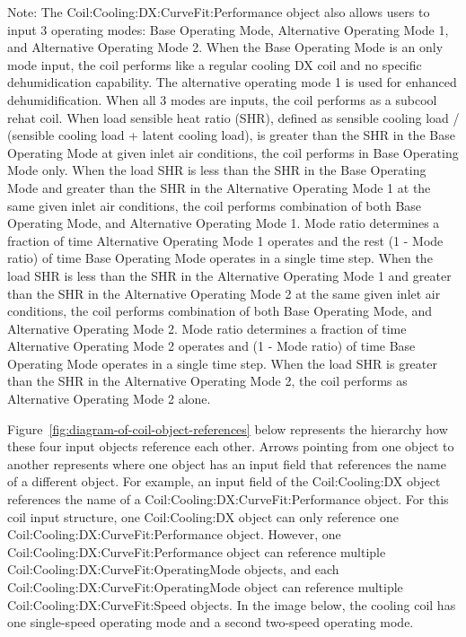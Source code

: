 Note: The Coil:Cooling:DX:CurveFit:Performance object also allows users to input 3 operating modes: Base Operating Mode, Alternative Operating Mode 1, and Alternative Operating Mode 2. When the Base Operating Mode is an only mode input, the coil performs like a regular cooling DX coil and no specific dehumidication capability. The alternative operating mode 1 is used for enhanced dehumidification. When all 3 modes are inputs, the coil performs as a subcool rehat coil. When load sensible heat ratio (SHR), defined as sensible cooling load / (sensible cooling load + latent cooling load), is greater than the SHR in the Base Operating Mode at given inlet air conditions, the coil performs in Base Operating Mode only. When the load SHR is less than the SHR in the Base Operating Mode and greater than the SHR in the Alternative Operating Mode 1 at the same given inlet air conditions, the coil performs combination of both Base Operating Mode, and Alternative Operating Mode 1. Mode ratio determines a fraction of time Alternative Operating Mode 1 operates and the rest (1 - Mode ratio) of time Base Operating Mode operates in a single time step. When the load SHR is less than the SHR in the Alternative Operating Mode 1 and greater than the SHR in the Alternative Operating Mode 2 at the same given inlet air conditions, the coil performs combination of both Base Operating Mode, and Alternative Operating Mode 2. Mode ratio determines a fraction of time Alternative Operating Mode 2 operates and (1 - Mode ratio) of time Base Operating Mode operates in a single time step.  When the load SHR is greater than the SHR in the Alternative Operating Mode 2, the coil performs as Alternative Operating Mode 2 alone.   

Figure~\ref{fig:diagram-of-coil-object-references} below represents the hierarchy how these four input objects reference each other. Arrows pointing from one object to another represents where one object has an input field that references the name of a different object. For example, an input field of the Coil:Cooling:DX object references the name of a Coil:Cooling:DX:CurveFit:Performance object. For this coil input structure, one Coil:Cooling:DX object can only reference one Coil:Cooling:DX:CurveFit:Performance object. However, one Coil:Cooling:DX:CurveFit:Performance object can reference multiple Coil:Cooling:DX:CurveFit:OperatingMode objects, and each Coil:Cooling:DX:CurveFit:OperatingMode object can reference multiple Coil:Cooling:DX:CurveFit:Speed objects. In the image below, the cooling coil has one single-speed operating mode and a second two-speed operating mode.

